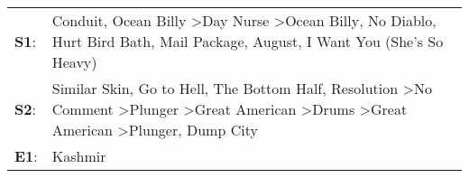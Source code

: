 \begin{supertabular}{p{0.03\textwidth}p{0.92\textwidth}}
 \textbf{S1}:  &                                                                                                                   Conduit\textsuperscript{}, \enspace Ocean Billy\textsuperscript{} \textgreater \enspace Day Nurse\textsuperscript{} \textgreater \enspace Ocean Billy\textsuperscript{}, \enspace No Diablo\textsuperscript{}, \enspace Hurt Bird Bath\textsuperscript{}, \enspace Mail Package\textsuperscript{}, \enspace August\textsuperscript{}, \enspace I Want You (She's So Heavy)\textsuperscript{}  \enspace  \\
 \textbf{S2}:  &  Similar Skin\textsuperscript{}, \enspace Go to Hell\textsuperscript{}, \enspace The Bottom Half\textsuperscript{}, \enspace Resolution\textsuperscript{} \textgreater \enspace No Comment\textsuperscript{} \textgreater \enspace Plunger\textsuperscript{} \textgreater \enspace Great American\textsuperscript{} \textgreater \enspace Drums\textsuperscript{} \textgreater \enspace Great American\textsuperscript{} \textgreater \enspace Plunger\textsuperscript{}, \enspace Dump City\textsuperscript{}  \enspace  \\
 \textbf{E1}:  &                                                                                                                                                                                                                                                                                                                                                                                                                                                                                      Kashmir\textsuperscript{}  \enspace  \\
\end{supertabular}
